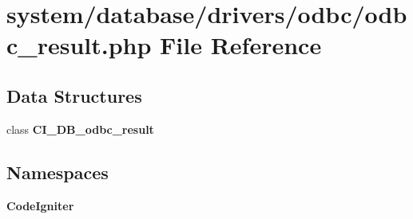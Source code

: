 \section{system/database/drivers/odbc/odbc\-\_\-result.php File Reference}
\label{odbc__result_8php}
\subsection*{Data Structures}
\begin{DoxyCompactItemize}
\item 
class {\bf C\-I\-\_\-\-D\-B\-\_\-odbc\-\_\-result}
\end{DoxyCompactItemize}
\subsection*{Namespaces}
\begin{DoxyCompactItemize}
\item 
{\bf Code\-Igniter}
\end{DoxyCompactItemize}
